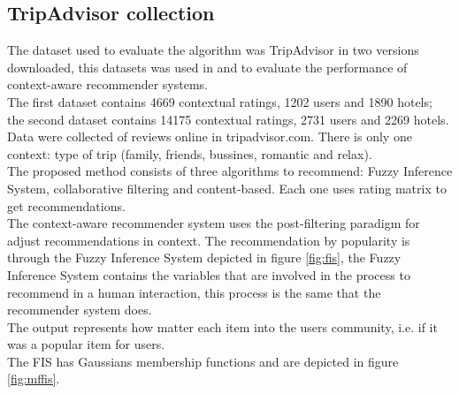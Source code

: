 \subsection{TripAdvisor collection} 

The dataset used to evaluate the algorithm was TripAdvisor in two
versions downloaded\cite{linkzeng}, this datasets was used in
\cite{zheng2014context} and \cite{zheng2012differential} to  evaluate the
performance of context-aware recommender systems. \\The first
dataset contains 4669 contextual ratings, 1202 users and 1890 hotels;
the second dataset contains 14175 contextual ratings, 2731 users and
2269 hotels. Data were collected of reviews online in tripadvisor.com.
There is only one context: type of trip (family, friends, bussines,
romantic and relax).\\ 
The proposed method consists of three algorithms to recommend: Fuzzy
Inference System, collaborative filtering and content-based. Each one
uses rating matrix to get recommendations.\\    
The context-aware recommender system uses the post-filtering
paradigm\cite{adomavicius2011context} for adjust recommendations in
context. The recommendation by popularity is through the Fuzzy
Inference System depicted in figure \ref{fig:fis}, the Fuzzy Inference
System contains the variables that are involved in the process to
recommend in a human interaction, this process is the same that the
recommender system does. \\The output represents how matter each item
into the users community, i.e. if it was a popular item for users. \\
The FIS has Gaussians membership functions and are depicted in figure
\ref{fig:mffis}.
